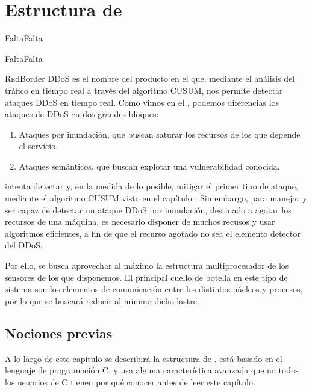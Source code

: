 \chapter{Estructura de \redborderddos}
\pagestyle{esitscCD}
\epigraph{  FaltaFalta }{FaltaFalta}

\lettrine[lraise=-0.1, lines=2, loversize=0.25]{R}edBorder DDoS es el nombre del producto en el 
que, mediante el análisis del tráfico en tiempo real a través del algoritmo \gls{CUSUM}, nos permite detectar ataques 
\gls{DDoS} en tiempo real. Como vimos en el , podemos diferencias los ataques de 
\gls{DDoS} en dos grandes bloques: 
\begin{enumerate}
 \item Ataques por inundación, que buscan saturar los recursos de los que depende el servicio.
 \item Ataques semánticos. que buscan explotar una vulnerabilidad conocida.
\end{enumerate}

\redborderddos{} intenta detectar y, en la medida de lo posible, mitigar el primer tipo de ataque, mediante el 
algoritmo \gls{CUSUM} visto en el capítulo . Sin embargo, para manejar y ser capaz de 
detectar un ataque \gls{DDoS} por inundación, destinado a agotar los recursos de una máquina, es necesario disponer de 
muchos recusos y usar algoritmos eficientes, a fin de que el recurso agotado no sea el elemento detector del \gls{DDoS}.

Por ello, se busca aprovechar al máximo la estructura multiprocesador de los sensores de los que disponemos. El 
principal cuello de botella en este tipo de sistema son los elementos de comunicación entre los distintos núcleos y 
procesos, por lo que se buscará reducir al mínimo dicho lastre.

\section{Nociones previas}


A lo largo de este capítulo se describirá la estructura de \redborderddos. \redborderddos{} está basado en el lenguaje 
de programación C, y usa alguna característica avanzada que no todos los usuarios de C tienen por qué conocer antes de 
leer este capítulo.

